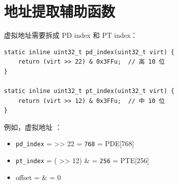 \section{地址提取辅助函数}

虚拟地址需要拆成 PD index 和 PT index：

\begin{lstlisting}[style=cstyle]
static inline uint32_t pd_index(uint32_t virt) {
    return (virt >> 22) & 0x3FFu;  // 高 10 位
}

static inline uint32_t pt_index(uint32_t virt) {
    return (virt >> 12) & 0x3FFu;  // 中 10 位
}
\end{lstlisting}

例如，虚拟地址 ：
\begin{itemize}
  \item \texttt{pd\_index} =  >> 22 = \texttt{768} = PDE[768]
  \item \texttt{pt\_index} = ( >> 12) \&  = \texttt{256} = PTE[256]
  \item offset =  \&  = 0
\end{itemize}


